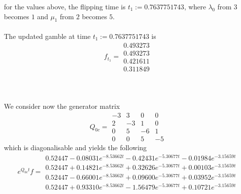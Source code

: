\documentclass{article}
\begin{document}
for the values above, the flipping time is $t_{1}:= 0.7637751743$, where $\lambda_{0}$ from $3$ becomes $1$ and $\mu_{1}$ from $2$ becomes $5$.\\\\
The updated gamble at time $t_{1}:= 0.7637751743$ is
\begin{equation*} 
 f_{t_1}= 
 \begin{array}{|c|}
  0.493273\\
  0.493273\\
  0.421611\\
  0.311849  
 \end{array}
 \end{equation*}\\\\\\
We consider now the generator matrix 
\begin{equation*} 
 Q_{0c}= 
 \begin{array}{|rrrr|}
  -3 & 3 & 0 & 0 \\
  2 & -3 & 1 & 0 \\
  0 & 5 & -6 & 1 \\
  0 & 0 & 5 & -5 
 \end{array}
 \end{equation*}
which is diagonalisable and yields the following
\begin{equation*} 
 e^{Q_{0c}t}f= 
 \begin{array}{|r|}
  0.52447-0.08031e^{-8.53662t}- 0.42431e^{-5.30677t}- 0.01984e^{-3.15659t}\\
  0.52447+0.14821e^{-8.53662t}+ 0.32626e^{-5.30677t}+ 0.00103e^{-3.15659t}\\
  0.52447-0.66001e^{-8.53662t}+ 0.09600e^{-5.30677t} + 0.03952e^{-3.15659t}\\
  0.52447+0.93310e^{-8.53662t}- 1.56479e^{-5.30677t}+ 0.10721e^{-3.15659t}  
 \end{array}
 \end{equation*}
\end{document}
